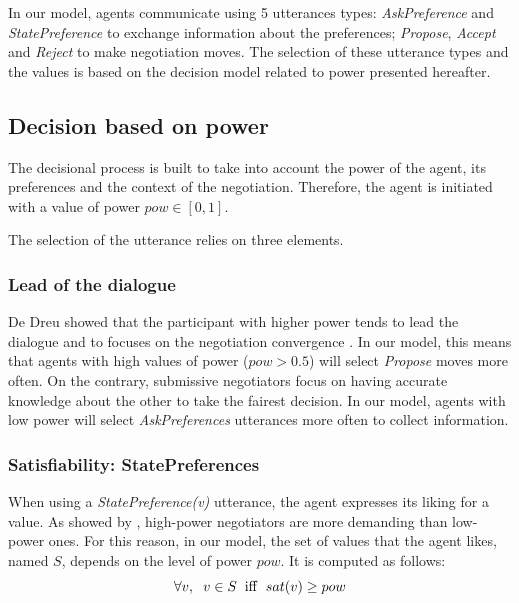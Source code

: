 \documentclass[sigconf]{aamas}  %
\begin{document}
	\par
	In our model, agents communicate using 5 utterances types: \emph{AskPreference} and \emph{StatePreference} to exchange information about the preferences; \emph{Propose}, \emph{Accept} and \emph{Reject} to make negotiation moves. The selection of these utterance types and the values is based on the decision model related to power presented hereafter.
	
	\subsection{Decision based on power}
	
	The decisional process is built to take into account the power of the agent, its preferences and the context of the negotiation. Therefore, the agent is initiated with a value of power $pow \in [0,1]$. 
	
	The selection of the utterance relies on three elements.
	
	\subsubsection{Lead of the dialogue}
	De Dreu showed that the participant with higher power tends to lead the dialogue and to focuses on the negotiation convergence \cite{magee2007power,de2004influence}. In our model, this means that agents with high values of power ($pow>0.5$) will select \emph{Propose} moves more often. On the contrary, submissive negotiators focus on having accurate knowledge about the other to take the fairest decision. In our model, agents with low power will select \emph{AskPreferences} utterances more often to collect information.
		
	\subsubsection{Satisfiability: StatePreferences}
	\label{sec:sat}
	When using a \emph{StatePreference(v)} utterance, the agent expresses its liking for a value. As showed by \cite{de1995impact}, high-power negotiators are more demanding than low-power ones. For this reason, in our model, the set of values that the agent likes, named $S$, depends on the level of power $pow$. It is computed as follows:
	\begin{equation}
	\forall v,\hspace{2mm} v\in S\hspace{2mm}\mathrm{iff}\hspace{2mm}sat(v) \geq pow
	\end{equation}
	
\end{document}
